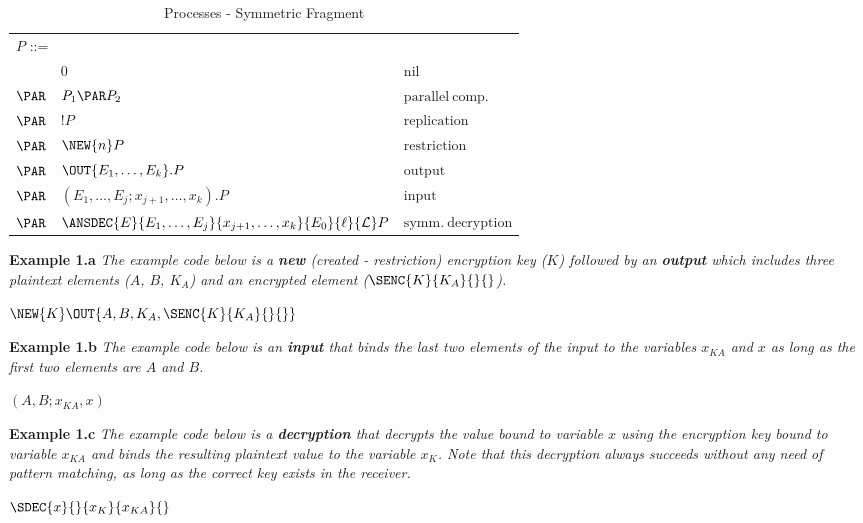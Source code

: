 \begin{table*}\caption{\LYSA Processes - Symmetric Fragment}
\label{tab:processes}
\centering
\begin{tabular}{lll}
\hline
\multicolumn{2}{l}{$P$ ::=}  \\
             & $0$                                                             & $\mathrm{nil}$ \\
$\PAR$ & $P_1 \PAR P_2 $                                                 & $\mathrm{parallel~comp.}$ \\
$\PAR$ & !$P $                                                           & $\mathrm{replication}$\\
$\PAR$ & $\NEW{n} P $                                                    & $\mathrm{restriction}$\\
$\PAR$ & $\OUT{E_1,\ldots,E_k}.P $                                       & $\mathrm{output}$\\
$\PAR$ & $(E_1,\ldots,E_j ; x_{j+1},\ldots,x_k).P $                       & $\mathrm{input}$\\
$\PAR$ & $\ANSDEC{E}{E_1,\ldots,E_j}{x_{j+1},\ldots,x_k}{E_0}{\ell}{\mathcal{L}} P $    & $\mathrm{symm.~decryption}$\\
\hline
\end{tabular}
\end{table*}
\textbf{Example 1.a}  \textit{The example \LYSA code below is a \textbf{new} (created - restriction) encryption key ($K$) followed by an \textbf{output} which includes three plaintext elements ($A$, $B$, $K_A$) and an encrypted element ($\SENC{K}{K_A}{}{}$).}
\begin{center}$\NEW{K}\OUT{A,B, K_A, \SENC{K}{K_A}{}{} }$\end{center} 

\textbf{Example 1.b}  \textit{The example \LYSA code below is an \textbf{input} that binds the last two elements of the input to the variables $x_{KA}$ and $x$ as long as the first two elements are $A$ and $B$.}
\begin{center}$(A, B ; x_{KA}, x)$\end{center} 

\textbf{Example 1.c}  \textit{The example \LYSA code below is a \textbf{decryption} that decrypts the value bound to variable $x$ using the encryption key bound to variable $x_{KA}$ and binds the resulting plaintext value to the variable $x_K$. Note that this decryption always succeeds without any need of pattern matching, as long as the correct key exists in the receiver.}
\begin{center}$\SDEC{x}{}{x_K}{x_{KA}}{}$\end{center} 

